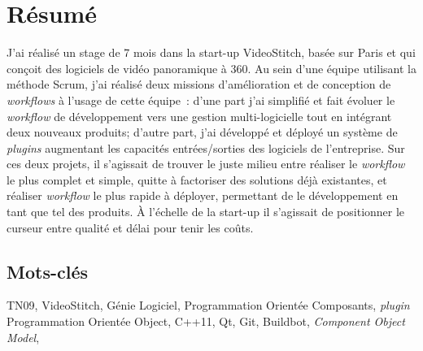\section*{Résumé}
J'ai réalisé un stage de 7 mois dans la start-up VideoStitch, basée sur Paris et qui
conçoit des logiciels de vidéo panoramique à 360\degree. Au sein d'une équipe utilisant
la méthode Scrum, j'ai réalisé deux missions d'amélioration et de conception de
\textit{workflows} à l'usage de cette équipe~: d'une part j'ai simplifié et fait évoluer
le \textit{workflow} de développement vers une gestion multi-logicielle
tout en intégrant deux nouveaux produits; d'autre part, j'ai développé
et déployé un système de \textit{plugins} augmentant les capacités entrées/sorties
des logiciels de l'entreprise. Sur ces deux projets, il s'agissait de trouver le
juste milieu entre réaliser le \textit{workflow} le plus complet et simple, 
quitte à factoriser des solutions déjà existantes, et réaliser \textit{workflow} 
le plus rapide à déployer, permettant de le développement en tant que tel des produits. 
À l'échelle de la start-up il s'agissait de positionner le curseur entre qualité
et délai pour tenir les coûts.

\subsection*{Mots-clés}
TN09, VideoStitch, Génie Logiciel, Programmation Orientée Composants, \textit{plugin}
Programmation Orientée Object, C++11, Qt, Git, Buildbot, \textit{Component Object Model},
